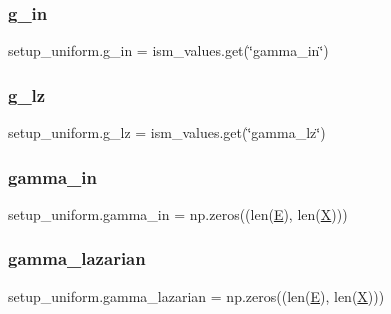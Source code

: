 \mbox{\label{namespacesetup__uniform_aedb12c9d2088fbf88345f8ae59677944}} 
\subsubsection{\texorpdfstring{g\+\_\+in}{g\_in}}
{\footnotesize\ttfamily setup\+\_\+uniform.\+g\+\_\+in = ism\+\_\+values.\+get(\char`\"{}gamma\+\_\+in\char`\"{})}

\mbox{\label{namespacesetup__uniform_ab5abb861c3c02fc5a39f3d7b5e4d1826}} 
\subsubsection{\texorpdfstring{g\+\_\+lz}{g\_lz}}
{\footnotesize\ttfamily setup\+\_\+uniform.\+g\+\_\+lz = ism\+\_\+values.\+get(\char`\"{}gamma\+\_\+lz\char`\"{})}

\mbox{\label{namespacesetup__uniform_a28608eebc4e4179e63589659494f432b}} 
\subsubsection{\texorpdfstring{gamma\+\_\+in}{gamma\_in}}
{\footnotesize\ttfamily setup\+\_\+uniform.\+gamma\+\_\+in = np.\+zeros((len(\hyperlink{namespacesetup__uniform_a05accd2e8ab1c28d2f58f024c9a64fac}{E}), len(\hyperlink{namespacesetup__uniform_a6d0e53624e475055c31146a2ff8d762c}{X})))}

\mbox{\label{namespacesetup__uniform_af0836679c8430d94431fe22050d1a928}} 
\subsubsection{\texorpdfstring{gamma\+\_\+lazarian}{gamma\_lazarian}}
{\footnotesize\ttfamily setup\+\_\+uniform.\+gamma\+\_\+lazarian = np.\+zeros((len(\hyperlink{namespacesetup__uniform_a05accd2e8ab1c28d2f58f024c9a64fac}{E}), len(\hyperlink{namespacesetup__uniform_a6d0e53624e475055c31146a2ff8d762c}{X})))}

